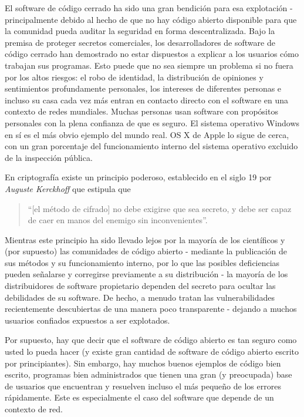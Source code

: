 \documentclass[10pt,a5paper,twoside,,]{book}
\begin{document}
El software de código cerrado ha sido una gran bendición para esa
explotación - principalmente debido al hecho de que no hay código
abierto disponible para que la comunidad pueda auditar la seguridad en
forma descentralizada. Bajo la premisa de proteger secretos comerciales,
los desarrolladores de software de código cerrado han demostrado no
estar dispuestos a explicar a los usuarios cómo trabajan sus programas.
Esto puede que no sea siempre un problema si no fuera por los altos
riesgos: el robo de identidad, la distribución de opiniones y
sentimientos profundamente personales, los intereses de diferentes
personas e incluso su casa cada vez más entran en contacto directo con
el software en una contexto de redes mundiales. Muchas personas usan
software con propósitos personales con la plena confianza de que es
seguro. El sistema operativo Windows en sí es el más obvio ejemplo del
mundo real. OS X de Apple lo sigue de cerca, con un gran porcentaje del
funcionamiento interno del sistema operativo excluido de la inspección
pública.

En criptografía existe un principio poderoso, establecido en el siglo 19
por \emph{Auguste Kerckhoff} que estipula que

\begin{quote}
``{[}el método de cifrado{]} no debe exigirse que sea secreto, y debe
ser capaz de caer en manos del enemigo sin inconvenientes''.
\end{quote}

Mientras este principio ha sido llevado lejos por la mayoría de los
científicos y (por supuesto) las comunidades de código abierto -
mediante la publicación de sus métodos y su funcionamiento interno, por
lo que las posibles deficiencias pueden señalarse y corregirse
previamente a su distribución - la mayoría de los distribuidores de
software propietario dependen del secreto para ocultar las debilidades
de su software. De hecho, a menudo tratan las vulnerabilidades
recientemente descubiertas de una manera poco transparente - dejando a
muchos usuarios confiados expuestos a ser explotados.

Por supuesto, hay que decir que el software de código abierto es tan
seguro como usted lo pueda hacer (y existe gran cantidad de software de
código abierto escrito por principiantes). Sin embargo, hay muchos
buenos ejemplos de código bien escrito, programas bien administrados que
tienen una gran (y preocupada) base de usuarios que encuentran y
resuelven incluso el más pequeño de los errores rápidamente. Este es
especialmente el caso del software que depende de un contexto de red.
\end{document}
